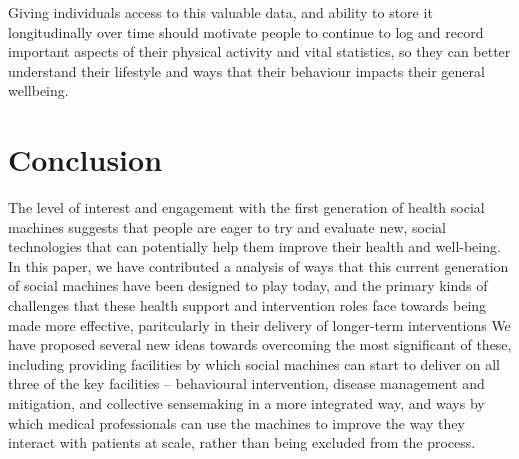 \documentclass{sig-alternate}
\begin{document}
Giving individuals access to this valuable data, and ability to store
it longitudinally over time should motivate people to continue to log
and record important aspects of their physical activity and vital
statistics, so they can better understand their lifestyle and ways that
their behaviour impacts their general wellbeing.

\section{Conclusion}

The level of interest and engagement with the first generation of
health social machines suggests that people are eager to try and
evaluate new, social technologies that can potentially help them
improve their health and well-being. In this paper, we have
contributed a analysis of ways that this current generation of social
machines have been designed to play today, and the primary kinds of
challenges that these health support and intervention roles face
towards being made more effective, paritcularly in their delivery of
longer-term interventions We have proposed several new ideas towards
overcoming the most significant of these, including providing
facilities by which social machines can start to deliver on all three
of the key facilities -- behavioural intervention, disease management
and mitigation, and collective sensemaking in a more integrated way,
and ways by which medical professionals can use the machines to 
improve the way they interact with patients at scale, rather than
being excluded from the process.


\end{document}
